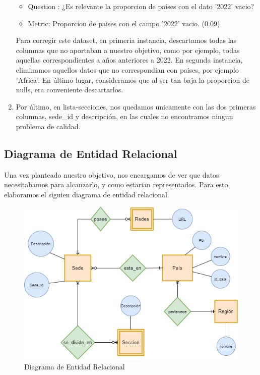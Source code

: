 \documentclass[10pt,a4paper]{article}
\begin{document}
\begin{enumerate}
\begin{itemize}
	\item Question : ¿Es relevante la proporcion de paises con el dato '2022' vacio?
	\item Metric: Proporcion de paises con el campo '2022' vacio. (0.09)
\end{itemize}
Para corregir este dataset, en primeria instancia, descartamos todas las columnas que no aportaban a nuestro objetivo, como por ejemplo, 
todas aquellas correspondientes a años anteriores a 2022. En segunda instancia, eliminamos aquellos datos que no correspondian con paises, 
por ejemplo 'Africa'. En último lugar, consideramos que al ser tan baja la proporcion de nulls, era conveniente descartarlos. 
	\item Por último, en lista-secciones, nos quedamos unicamente con las dos primeras columnas, sede\_id y descripción, en las cuales no encontramos ningun problema de calidad.
\end{enumerate}

\subsection{Diagrama de Entidad Relacional} \vspace{0.2cm}

Una vez planteado nuestro objetivo, nos encargamos de ver que datos necesitabamos para alcanzarlo, y como estarian representados. Para esto, elaboramos el siguien diagrama de entidad
relacional.  \vspace{0.2cm}

\begin{figure}[ht]
	\centering
	\includegraphics[width=1\textwidth]{DerFinal.png}
	\caption{Diagrama de Entidad Relacional}
	\label{fig:ejemplo}
\end{figure} \vspace{0.1cm}
\end{document}
